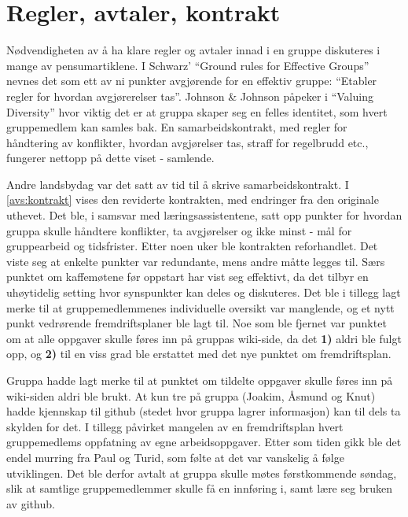 \section{Regler, avtaler, kontrakt}
\label{sec:kontrakt}
Nødvendigheten av å ha klare regler og avtaler innad i en gruppe diskuteres i
mange av pensumartiklene. I Schwarz' ``Ground rules for Effective Groups''
\cite{schwarz} nevnes det som ett av ni punkter avgjørende for en effektiv
gruppe: ``Etabler regler for hvordan avgjørerelser
tas''. Johnson \& Johnson påpeker i ``Valuing Diversity'' \cite{jj} hvor viktig det er at gruppa skaper seg en felles
identitet, som hvert gruppemedlem kan samles bak. En samarbeidskontrakt, med
regler for håndtering av konflikter, hvordan avgjørelser tas, straff for
regelbrudd etc., fungerer nettopp på dette viset -
samlende. 

Andre landsbydag var det satt av tid til å skrive samarbeidskontrakt. 
I \cref{avs:kontrakt} vises den reviderte kontrakten, med endringer fra den
originale uthevet. Det ble, i
samsvar med læringsassistentene, satt opp punkter for hvordan gruppa skulle
håndtere konflikter, ta avgjørelser og ikke minst - mål for gruppearbeid og
tidsfrister. Etter noen uker ble kontrakten reforhandlet. Det viste seg at
enkelte punkter var redundante, mens andre måtte legges til. Særs punktet om
kaffemøtene før oppstart har vist seg effektivt, da det tilbyr en uhøytidelig
setting hvor synspunkter kan deles og diskuteres. Det ble i
tillegg lagt merke til at gruppemedlemmenes individuelle oversikt var manglende, og et nytt
punkt vedrørende fremdriftsplaner ble lagt til. Noe som ble fjernet var punktet
om at alle oppgaver skulle føres inn på gruppas wiki-side, da det \textbf{1)} aldri ble
fulgt opp, og \textbf{2)} til en viss grad ble erstattet med det nye punktet om
fremdriftsplan. 

Gruppa hadde lagt merke til at punktet om tildelte oppgaver skulle føres
inn på wiki-siden aldri ble brukt. At kun tre på gruppa (Joakim, Åsmund og Knut)
hadde kjennskap til github (stedet hvor gruppa lagrer informasjon) kan til dels
ta skylden for det. I tillegg påvirket mangelen av en fremdriftsplan hvert
gruppemedlems oppfatning av egne arbeidsoppgaver. Etter som tiden gikk ble det
endel murring fra Paul og Turid, som følte at det var vanskelig
å følge utviklingen. Det ble derfor avtalt at gruppa skulle møtes førstkommende
søndag, slik at samtlige gruppemedlemmer skulle få en innføring i, samt lære seg
bruken av github. 

